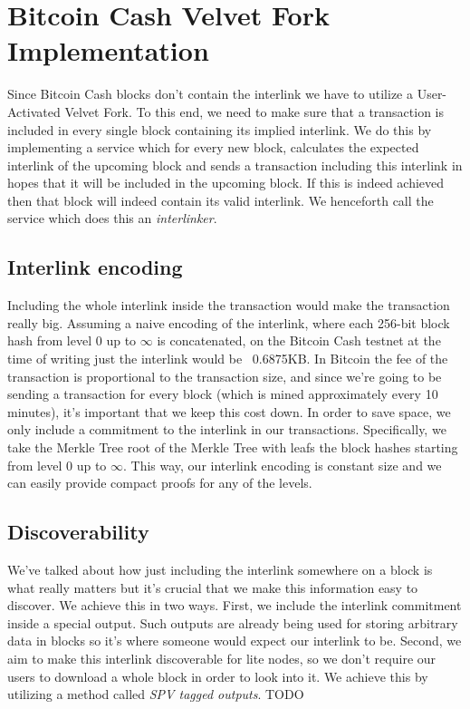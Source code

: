 \chapter{Bitcoin Cash Velvet Fork Implementation}
Since Bitcoin Cash blocks don't contain the interlink we have to utilize a User-Activated Velvet Fork. To this end, we need to make sure that a transaction is included in every single block containing its implied interlink. We do this by implementing a service which for every new block, calculates the expected interlink of the upcoming block and sends a transaction including this interlink in hopes that it will be included in the upcoming block. If this is indeed achieved then that block will indeed contain its valid interlink. We henceforth call the service which does this an \emph{interlinker}.

\section{Interlink encoding}
Including the whole interlink inside the transaction would make the transaction really big. Assuming a naive encoding of the interlink, where each 256-bit block hash from level $0$ up to $\infty$ is concatenated, on the Bitcoin Cash testnet at the time of writing just the interlink would be ~0.6875KB. In Bitcoin the fee of the transaction is proportional to the transaction size, and since we're going to be sending a transaction for every block (which is mined approximately every 10 minutes), it's important that we keep this cost down. In order to save space, we only include a commitment to the interlink in our transactions. Specifically, we take the Merkle Tree root of the Merkle Tree with leafs the block hashes starting from level $0$ up to $\infty$. This way, our interlink encoding is constant size and we can easily provide compact proofs for any of the levels.

\section{Discoverability}
We've talked about how just including the interlink somewhere on a block is what really matters but it's crucial that we make this information easy to discover. We achieve this in two ways. First, we include the interlink commitment inside a special  output. Such outputs are already being used for storing arbitrary data in blocks so it's where someone would expect our interlink to be. Second, we aim to make this interlink discoverable for lite nodes, so we don't require our users to download a whole block in order to look into it. We achieve this by utilizing a method called \emph{SPV tagged outputs}. TODO

